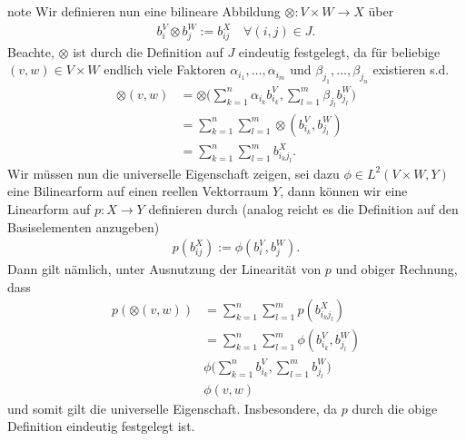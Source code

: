 \documentclass[letterpaper,10pt,english]{jupyterBook}
\begin{document}
\begin{sphinxadmonition}{note}
\sphinxAtStartPar
Wir definieren nun eine bilineare Abbildung \(\otimes: V\times W\to X\) über
\begin{equation*}
\begin{split}b_i^V \otimes b_j^W := b_{ij}^X\quad\forall (i,j)\in J.\end{split}
\end{equation*}
\sphinxAtStartPar
Beachte, \(\otimes\) ist durch die Definition auf \(J\) eindeutig festgelegt, da für beliebige \((v,w)\in V\times W\) endlich viele Faktoren
\(\alpha_{i_1},\ldots,\alpha_{i_m}\) und \(\beta_{j_1},\ldots, \beta_{j_n}\) existieren s.d.
\begin{equation*}
\begin{split}\otimes(v,w) 
&= 
\otimes\big(\sum_{k=1}^n \alpha_{i_k} b_{i_k}^V, \sum_{l=1}^m \beta_{j_l} b_{j_l}^W\big) 
\\&= 
\sum_{k=1}^n \sum_{l=1}^m \otimes\left(b_{i_k}^V, b_{j_l}^W\right)
\\&=
\sum_{k=1}^n \sum_{l=1}^m b_{i_kj_l}^X.\end{split}
\end{equation*}
\sphinxAtStartPar
Wir müssen nun die universelle Eigenschaft zeigen, sei dazu \(\phi\in L^2(V\times W, Y)\) eine Bilinearform auf einen reellen Vektorraum \(Y\), dann können wir eine Linearform auf \(p:X\to Y\) definieren durch (analog reicht es die Definition auf den Basiselementen anzugeben)
\begin{equation*}
\begin{split}p(b_{ij}^X) := \phi(b_i^V, b_j^W).\end{split}
\end{equation*}
\sphinxAtStartPar
Dann gilt nämlich, unter Ausnutzung der Linearität von \(p\) und obiger Rechnung, dass
\begin{equation*}
\begin{split}p(\otimes(v,w)) 
&=
\sum_{k=1}^n \sum_{l=1}^m p(b_{i_kj_l}^X)
\\&=
\sum_{k=1}^n \sum_{l=1}^m \phi\left(b_{i_k}^V, b_{j_l}^W\right)
\\&
\phi\big(\sum_{k=1}^n  b_{i_k}^V,\sum_{l=1}^m b_{j_l}^W\big)
\\&
\phi(v,w)\end{split}
\end{equation*}
\sphinxAtStartPar
und somit gilt die universelle Eigenschaft. Insbesondere, da \(p\) durch die obige Definition eindeutig festgelegt ist.
\end{sphinxadmonition}
\end{document}

